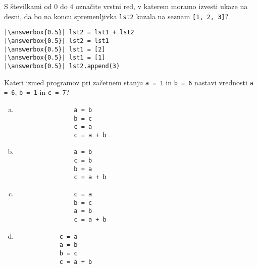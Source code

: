\documentclass[arhiv, 10pt]{../izpit}
\newcommand{\inlinepy}[1]{\texttt{#1}}
\newcommand{\answerbox}[1]{\framebox{\vphantom{\large M}\hspace{#1cm}}}
\begin{document}
        \naloga*
        \begin{multicols}{2}
        \noindent 
        S številkami od $0$ do $4$ označite vrstni red, v katerem moramo izvesti ukaze na desni, da bo na koncu spremenljivka \inlinepy{lst2} kazala na seznam \inlinepy{[1, 2, 3]}?
    
        \columnbreak
        \noindent
        \begin{verbatim}
|\answerbox{0.5}| lst2 = lst1 + lst2
|\answerbox{0.5}| lst2 = lst1
|\answerbox{0.5}| lst1 = [2]
|\answerbox{0.5}| lst1 = [1]
|\answerbox{0.5}| lst2.append(3)

        \end{verbatim}
        \end{multicols}
    
            
        \naloga*
        
        Kateri izmed programov pri začetnem stanju
            \inlinepy{a = 1} in
            \inlinepy{b = 6}
        nastavi vrednosti
            \inlinepy{a = 6},
            \inlinepy{b = 1} in
            \inlinepy{c = 7}?
    
        \begin{multicols}{4}
        \begin{enumerate}[(a)]
\item 
                \begin{verbatim}
                a = b
                b = c
                c = a
                c = a + b
                \end{verbatim}
            
\item 
                \begin{verbatim}
                a = b
                c = b
                b = a
                c = a + b
                \end{verbatim}
            
\item 
                \begin{verbatim}
                c = a
                b = c
                a = b
                c = a + b
                \end{verbatim}
            
\item 
            \begin{verbatim}
            c = a
            a = b
            b = c
            c = a + b
            \end{verbatim}
        
\end{enumerate}

        \end{multicols}
    
\end{document}
